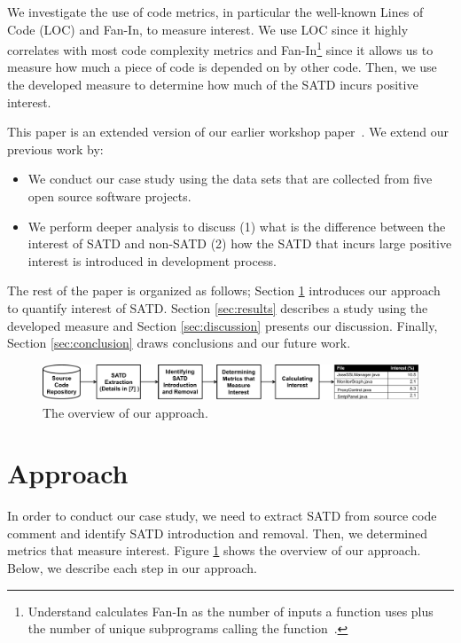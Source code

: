 \documentclass[10pt, conference]{IEEEtran}
\begin{document}
We investigate the use of code metrics, in particular the well-known Lines of Code (LOC) and Fan-In, to measure interest. We use LOC since it highly correlates with most code complexity metrics and Fan-In\footnote{{\sc Understand} calculates Fan-In as the number of inputs a function uses plus the number of unique subprograms calling the function~\cite{FANIN}.} since it allows us to measure how much a piece of code is depended on by other code. Then, we use the developed measure to determine how much of the SATD incurs positive interest. 

This paper is an extended version of our earlier workshop paper~\cite{Kamei2016TDA}. We extend our previous work by:

\begin{itemize}
\item We conduct our case study using the data sets that are collected from five open source software projects.
\item We perform deeper analysis to discuss (1) what is the difference  between the interest of SATD and non-SATD (2) how the SATD that incurs large positive interest is introduced in development process.  
\end{itemize}

The rest of the paper is organized as follows; Section \ref{sec:approach} introduces our approach to quantify interest of SATD. Section \ref{sec:results} describes a study using the developed measure and Section \ref{sec:discussion} presents our discussion. Finally, Section \ref{sec:conclusion} draws conclusions and our future work.

\begin{figure}[!t]
  \begin{center}
  \includegraphics[width=.95\textwidth]{figures/overview}
  \caption{The overview of our approach.}
  \label{fig:overview}
  \end{center}
\end{figure}

\section{Approach} \label{sec:approach}
In order to conduct our case study, we need to extract SATD from source code comment and identify SATD introduction and removal. Then, we determined metrics that measure interest. Figure \ref{fig:overview} shows the overview of our approach. Below, we describe each step in our approach.
\end{document}

